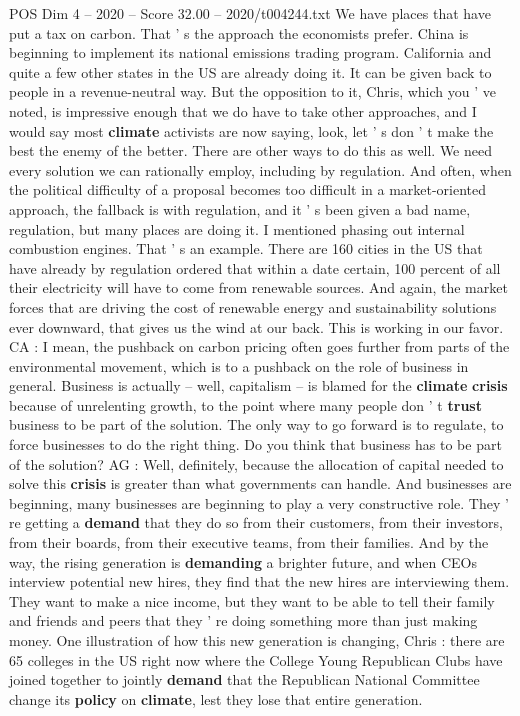 \begin{textsample}{POS Dim 4 – 2020 – Score 32.00 – 2020/t004244.txt}
We have places that have put a tax on carbon.
That ' s the approach the economists prefer.
China is beginning to implement its national emissions trading program.
California and quite a few other states in the US are already doing it.
It can be given back to people in a revenue-neutral way.
But the opposition to it, Chris, which you ' ve noted, is impressive enough that we do have to take other approaches, and I would say most \textbf{climate} activists are now saying, look, let ' s don ' t make the best the enemy of the better.
There are other ways to do this as well.
We need every solution we can rationally employ, including by regulation.
And often, when the political difficulty of a proposal becomes too difficult in a market-oriented approach, the fallback is with regulation, and it ' s been given a bad name, regulation, but many places are doing it.
I mentioned phasing out internal combustion engines.
That ' s an example.
There are 160 cities in the US that have already by regulation ordered that within a date certain, 100 percent of all their electricity will have to come from renewable sources.
And again, the market forces that are driving the cost of renewable energy and sustainability solutions ever downward, that gives us the wind at our back.
This is working in our favor.
CA : I mean, the pushback on carbon pricing often goes further from parts of the environmental movement, which is to a pushback on the role of business in general.
Business is actually -- well, capitalism -- is blamed for the \textbf{climate} \textbf{crisis} because of unrelenting growth, to the point where many people don ' t \textbf{trust} business to be part of the solution.
The only way to go forward is to regulate, to force businesses to do the right thing.
Do you think that business has to be part of the solution?
AG : Well, definitely, because the allocation of capital needed to solve this \textbf{crisis} is greater than what governments can handle.
And businesses are beginning, many businesses are beginning to play a very constructive role.
They ' re getting a \textbf{demand} that they do so from their customers, from their investors, from their boards, from their executive teams, from their families.
And by the way, the rising generation is \textbf{demanding} a brighter future, and when CEOs interview potential new hires, they find that the new hires are interviewing them.
They want to make a nice income, but they want to be able to tell their family and friends and peers that they ' re doing something more than just making money.
One illustration of how this new generation is changing, Chris : there are 65 colleges in the US right now where the College Young Republican Clubs have joined together to jointly \textbf{demand} that the Republican National Committee change its \textbf{policy} on \textbf{climate}, lest they lose that entire generation.

\end{textsample}
